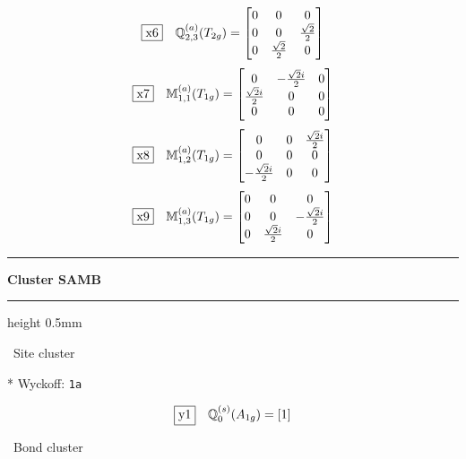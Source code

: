 \documentclass[fleqn,10pt,landscape]{jsarticle}
\begin{document}
\begin{dmath*}
\fbox{x6}\quad \mathbb{Q}_{2,3}^{(a)}(T_{2g})=\begin{bmatrix} 0 & 0 & 0 \\ 0 & 0 & \frac{\sqrt{2}}{2} \\ 0 & \frac{\sqrt{2}}{2} & 0 \end{bmatrix}
\end{dmath*}
\begin{dmath*}
\fbox{x7}\quad \mathbb{M}_{1,1}^{(a)}(T_{1g})=\begin{bmatrix} 0 & - \frac{\sqrt{2} i}{2} & 0 \\ \frac{\sqrt{2} i}{2} & 0 & 0 \\ 0 & 0 & 0 \end{bmatrix}
\end{dmath*}
\begin{dmath*}
\fbox{x8}\quad \mathbb{M}_{1,2}^{(a)}(T_{1g})=\begin{bmatrix} 0 & 0 & \frac{\sqrt{2} i}{2} \\ 0 & 0 & 0 \\ - \frac{\sqrt{2} i}{2} & 0 & 0 \end{bmatrix}
\end{dmath*}
\begin{dmath*}
\fbox{x9}\quad \mathbb{M}_{1,3}^{(a)}(T_{1g})=\begin{bmatrix} 0 & 0 & 0 \\ 0 & 0 & - \frac{\sqrt{2} i}{2} \\ 0 & \frac{\sqrt{2} i}{2} & 0 \end{bmatrix}
\end{dmath*}
\vspace{5mm}
\noindent \rule[0.5mm]{5mm}{0.5mm}\hspace{3mm}\textbf{Cluster SAMB}\hspace{3mm}\leaders\hrule height 0.5mm\hfill\kern0pt
\vspace{3mm}

\noindent\textbullet\, Site cluster

\vspace{5mm}

\noindent ** Wyckoff: \texttt{1a}

\begin{dmath*}
\fbox{y1}\quad \mathbb{Q}_{0}^{(s)}(A_{1g})=\left[ 1 \right]
\end{dmath*}
\vspace{5mm}

\noindent\textbullet\, Bond cluster
\end{document}
